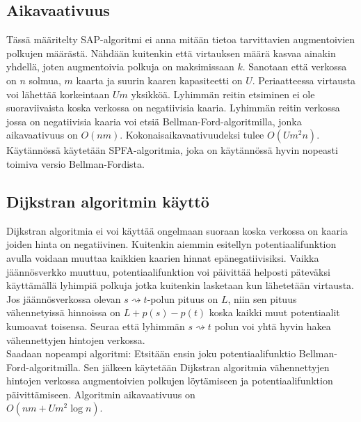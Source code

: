 \documentclass[a4paper, 11pt]{article}
\begin{document}
\subsection*{Aikavaativuus}
Tässä määritelty SAP-algoritmi ei anna mitään tietoa tarvittavien augmentoivien
polkujen määrästä. Nähdään kuitenkin että virtauksen määrä kasvaa ainakin yhdellä, joten
augmentoivia polkuja on maksimissaan $k$. Sanotaan että verkossa on $n$ solmua,
$m$ kaarta ja suurin kaaren kapasiteetti on $U$. Periaatteessa virtausta voi lähettää 
korkeintaan $Um$ yksikköä. Lyhimmän reitin
etsiminen ei ole suoraviivaista koska verkossa on negatiivisia kaaria. Lyhimmän reitin
verkossa jossa on negatiivisia kaaria
voi etsiä Bellman-Ford-algoritmilla, jonka aikavaativuus on $O(nm)$.
Kokonaisaikavaativuudeksi tulee $O(Um^2n)$. Käytännössä käytetään
SPFA-algoritmia, joka on käytännössä hyvin nopeasti toimiva versio Bellman-Fordista.
\subsection*{Dijkstran algoritmin käyttö}
Dijkstran algoritmia ei voi käyttää ongelmaan suoraan koska verkossa on kaaria joiden hinta on
negatiivinen. Kuitenkin aiemmin esitellyn potentiaalifunktion
avulla voidaan muuttaa kaikkien kaarien hinnat epänegatiivisiksi. 
Vaikka jäännösverkko muuttuu, potentiaalifunktion voi päivittää helposti päteväksi
käyttämällä lyhimpiä polkuja jotka kuitenkin lasketaan kun lähetetään virtausta.
Jos jäännösverkossa olevan $s \rightsquigarrow t$-polun pituus on $L$, niin
sen pituus vähennetyissä hinnoissa on $L + p(s) - p(t)$ koska kaikki muut potentiaalit
kumoavat toisensa. Seuraa että lyhimmän 
$s \rightsquigarrow t$ polun voi yhtä hyvin hakea vähennettyjen hintojen verkossa.\\
Saadaan nopeampi algoritmi: Etsitään ensin joku potentiaalifunktio Bellman-Ford-algoritmilla.
Sen jälkeen käytetään Dijkstran algoritmia vähennettyjen hintojen verkossa augmentoivien polkujen
löytämiseen ja potentiaalifunktion päivittämiseen. Algoritmin aikavaativuus on \\$O(nm + Um^2 \log n)$.
\end{document}
